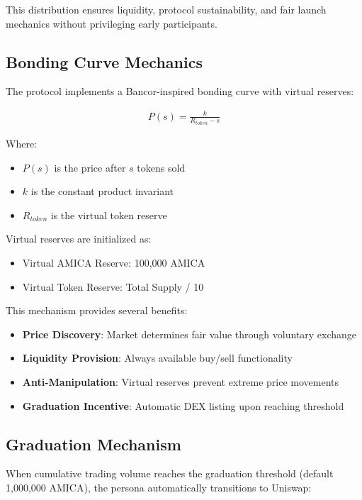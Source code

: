 \documentclass{article}
\begin{document}
This distribution ensures liquidity, protocol sustainability, and fair launch mechanics without privileging early participants.

\subsection{Bonding Curve Mechanics}

The protocol implements a Bancor-inspired bonding curve with virtual reserves:

\begin{align}
P(s) = \frac{k}{R_{token} - s}
\end{align}

Where:
\begin{itemize}
    \item $P(s)$ is the price after $s$ tokens sold
    \item $k$ is the constant product invariant
    \item $R_{token}$ is the virtual token reserve
\end{itemize}

Virtual reserves are initialized as:
\begin{itemize}
    \item Virtual AMICA Reserve: 100,000 AMICA
    \item Virtual Token Reserve: Total Supply / 10
\end{itemize}

This mechanism provides several benefits:

\begin{itemize}
    \item \textbf{Price Discovery}: Market determines fair value through voluntary exchange
    \item \textbf{Liquidity Provision}: Always available buy/sell functionality
    \item \textbf{Anti-Manipulation}: Virtual reserves prevent extreme price movements
    \item \textbf{Graduation Incentive}: Automatic DEX listing upon reaching threshold
\end{itemize}

\subsection{Graduation Mechanism}

When cumulative trading volume reaches the graduation threshold (default 1,000,000 AMICA), the persona automatically transitions to Uniswap:
\end{document}
